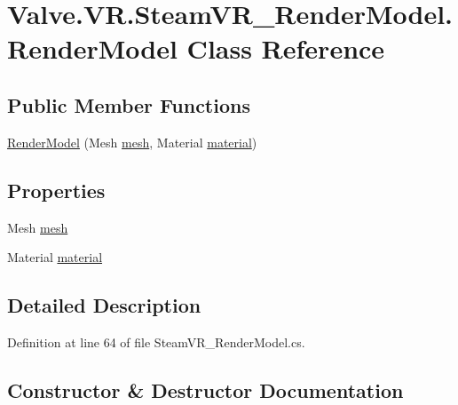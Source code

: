 \hypertarget{class_valve_1_1_v_r_1_1_steam_v_r___render_model_1_1_render_model}{}\section{Valve.\+V\+R.\+Steam\+V\+R\+\_\+\+Render\+Model.\+Render\+Model Class Reference}
\label{class_valve_1_1_v_r_1_1_steam_v_r___render_model_1_1_render_model}
\subsection*{Public Member Functions}
\begin{DoxyCompactItemize}
\item 
\mbox{\hyperlink{class_valve_1_1_v_r_1_1_steam_v_r___render_model_1_1_render_model_a381f0a0a9d2b8ce30be042c6a2b29ac8}{Render\+Model}} (Mesh \mbox{\hyperlink{class_valve_1_1_v_r_1_1_steam_v_r___render_model_1_1_render_model_aded51c30fc3950960db2b3df166f5e18}{mesh}}, Material \mbox{\hyperlink{class_valve_1_1_v_r_1_1_steam_v_r___render_model_1_1_render_model_a9001f7a0fc96e519b20d785bb45f7eb3}{material}})
\end{DoxyCompactItemize}
\subsection*{Properties}
\begin{DoxyCompactItemize}
\item 
Mesh \mbox{\hyperlink{class_valve_1_1_v_r_1_1_steam_v_r___render_model_1_1_render_model_aded51c30fc3950960db2b3df166f5e18}{mesh}}
\item 
Material \mbox{\hyperlink{class_valve_1_1_v_r_1_1_steam_v_r___render_model_1_1_render_model_a9001f7a0fc96e519b20d785bb45f7eb3}{material}}
\end{DoxyCompactItemize}


\subsection{Detailed Description}


Definition at line 64 of file Steam\+V\+R\+\_\+\+Render\+Model.\+cs.



\subsection{Constructor \& Destructor Documentation}
\mbox{\label{class_valve_1_1_v_r_1_1_steam_v_r___render_model_1_1_render_model_a381f0a0a9d2b8ce30be042c6a2b29ac8}} 

